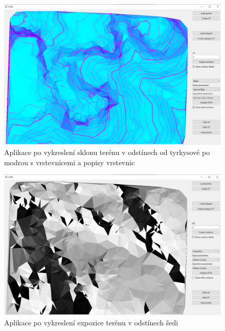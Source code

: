 \documentclass[11pt]{article}
\begin{document}
\begin{figure}[htbh]
	\centering
	\captionsetup{justification=centering}
	\includegraphics[scale=0.35]{images/vystup_AnalyzeDTM_slope_c2b_wContours.png} 
	\caption{Aplikace po vykreslení sklonu terénu v odstínech od tyrkysové po modrou s vrstevnicemi a popisy vrstevnic}	
\label{fig:vystup_AnalyzeDTM_slope_c2b_wContours}
\end{figure}
\begin{figure}[htbh]
	\centering
	\captionsetup{justification=centering}
	\includegraphics[scale=0.35]{images/vystup_AnalyzeDTM_exposition_shadesofgrey.png} 
	\caption{Aplikace po vykreslení expozice terénu v odstínech šedi}	\label{fig:vystup_AnalyzeDTM_exposition_shadesofgrey}
\end{figure} 
\end{document}
